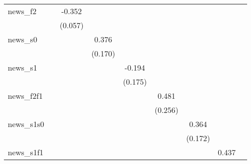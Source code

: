 {\begin{tabular}{l*{8}{c}}
news\_f2     &                     &      -0.352\sym{***}&                     &                     &                     &                     &                     &                     \\
            &                     &     (0.057)         &                     &                     &                     &                     &                     &                     \\
\addlinespace
news\_s0     &                     &                     &       0.376\sym{**} &                     &                     &                     &                     &                     \\
            &                     &                     &     (0.170)         &                     &                     &                     &                     &                     \\
\addlinespace
news\_s1     &                     &                     &                     &      -0.194         &                     &                     &                     &                     \\
            &                     &                     &                     &     (0.175)         &                     &                     &                     &                     \\
\addlinespace
news\_f2f1   &                     &                     &                     &                     &       0.481\sym{*}  &                     &                     &                     \\
            &                     &                     &                     &                     &     (0.256)         &                     &                     &                     \\
\addlinespace
news\_s1s0   &                     &                     &                     &                     &                     &       0.364\sym{**} &                     &                     \\
            &                     &                     &                     &                     &                     &     (0.172)         &                     &                     \\
\addlinespace
news\_s1f1   &                     &                     &                     &                     &                     &                     &       0.437         &                     \\

\end{tabular}}
